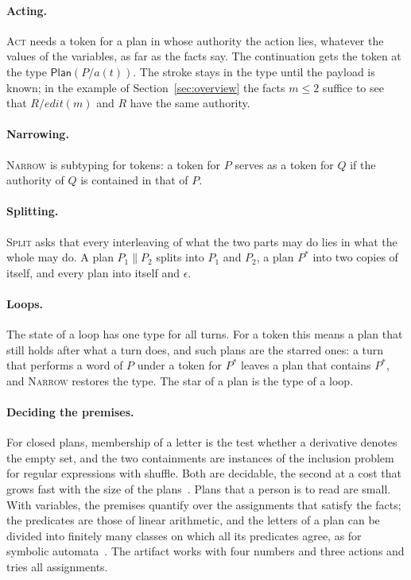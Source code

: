 \documentclass[acmsmall,nonacm,screen]{acmart}
\newcommand{\kw}[1]{\mathsf{#1}}
\newcommand{\nm}[1]{\mathit{#1}}
\newcommand{\Plan}[1]{\kw{Plan}(#1)}
\newcommand{\edit}{\nm{edit}}
\begin{document}
\paragraph{Acting.} \textsc{Act} needs a token for a plan in whose authority the action
lies, whatever the values of the variables, as far as the facts say. The continuation gets
the token at the type $\Plan{P / a(t)}$. The stroke stays in the type until the payload is
known; in the example of Section~\ref{sec:overview} the facts $m \le 2$ suffice to see that
$R / \edit(m)$ and $R$ have the same authority.

\paragraph{Narrowing.} \textsc{Narrow} is subtyping for tokens: a token for $P$ serves as a
token for $Q$ if the authority of $Q$ is contained in that of $P$.

\paragraph{Splitting.} \textsc{Split} asks that every interleaving of what the two parts may
do lies in what the whole may do. A plan $P_1 \parallel P_2$ splits into $P_1$ and $P_2$, a
plan $P^{*}$ into two copies of itself, and every plan into itself and $\epsilon$.

\paragraph{Loops.} The state of a loop has one type for all turns. For a token this means a
plan that still holds after what a turn does, and such plans are the starred ones: a turn
that performs a word of $P$ under a token for $P^{*}$ leaves a plan that contains $P^{*}$,
and \textsc{Narrow} restores the type. The star of a plan is the type of a loop.

\paragraph{Deciding the premises.} For closed plans, membership of a letter is the test
whether a derivative denotes the empty set, and the two containments are instances of the
inclusion problem for regular expressions with shuffle. Both are decidable, the second at a
cost that grows fast with the size of the plans~\citep{stockmeyer1973,mayer1994}. Plans that
a person is to read are small. With variables, the premises quantify over the assignments
that satisfy the facts; the predicates are those of linear arithmetic, and the letters of a
plan can be divided into finitely many classes on which all its predicates agree, as for
symbolic automata~\citep{dantoni2017}. The artifact works with four numbers and three
actions and tries all assignments.
\end{document}
